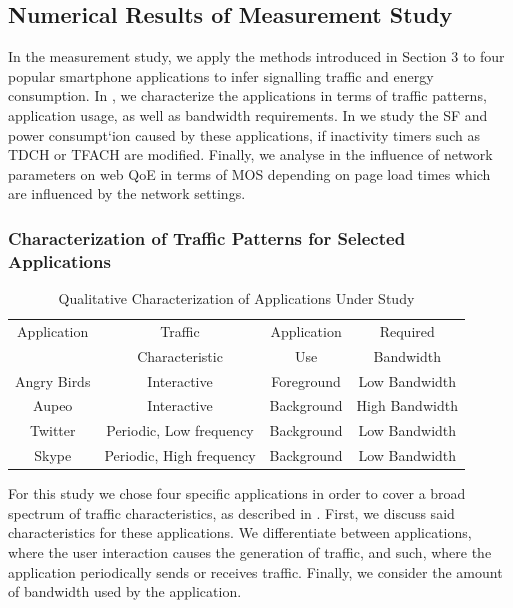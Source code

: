 \subsection{Numerical Results of Measurement Study}\label{sec:network:network_traces:numerical_results}
In the measurement study, we apply the methods introduced in Section 3 to four popular smartphone
applications to infer signalling traffic and energy consumption.
In , we characterize the applications in terms of traffic patterns, application usage, as well as bandwidth requirements.
In  we study the \gls{SF} and power consumpt`ion caused by these applications, if inactivity timers such as \gls{TDCH} or \gls{TFACH} are modified.
Finally, we analyse in  the influence of network parameters on web \gls{QoE} in terms of \gls{MOS} depending on page load times which are influenced by the network settings.

\subsubsection*{Characterization of Traffic Patterns for Selected Applications}\label{sec:network:network_traces:numerical_results:traffic_characterization}

\begin{table}
  \centering
  \begin{tabular}{cccc}
  	\bottomrule
    Application&Traffic&Application&Required\\
    &Characteristic&Use&Bandwidth\\
    \midrule
    Angry Birds & Interactive & Foreground & Low Bandwidth \\
    Aupeo & Interactive & Background & High Bandwidth\\
    Twitter & Periodic, Low frequency & Background & Low Bandwidth\\
    Skype & Periodic, High frequency& Background & Low Bandwidth\\
    \bottomrule
  \end{tabular}
  \caption{Qualitative Characterization of Applications Under Study}
  \label{tab:network:network_traces:numerical_results:app_characterization}
\end{table}

For this study we chose four specific applications in order to cover a broad spectrum of traffic characteristics, as described in .
First, we discuss said characteristics for these applications.
We differentiate between applications, where the user interaction causes the generation of traffic, and such, where the application periodically sends or receives traffic.
Finally, we consider the amount of bandwidth used by the application.

